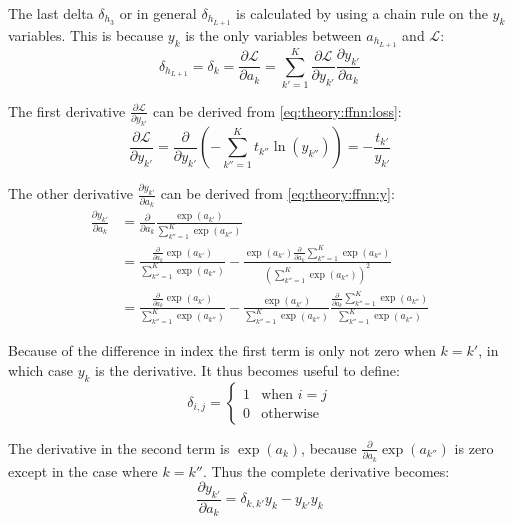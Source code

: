 The last delta $\delta_{h_3}$ or in general $\delta_{h_{L+1}}$ is calculated by using a chain rule on the $y_k$ variables. This is because $y_k$ is the only variables between $a_{h_{L+1}}$ and $\mathcal{L}$:
\begin{equation}
\delta_{h_{L + 1}} = \delta_k = \frac{\partial \mathcal{L}}{\partial a_k} = \sum_{k'=1}^K \frac{\partial \mathcal{L}}{\partial y_{k'}} \frac{\partial y_{k'}}{\partial a_k}
\label{eq:theory:ffnn:bprop-deltaK}
\end{equation}

The first derivative $\frac{\partial \mathcal{L}}{\partial y_{k'}}$ can be derived from \eqref{eq:theory:ffnn:loss}:
\begin{equation}
\frac{\partial \mathcal{L}}{\partial y_{k'}} = \frac{\partial}{\partial y_{k'}} \left(- \sum_{k''=1}^K t_{k''} \ln(y_{k''})\right) = -\frac{t_{k'}}{y_{k'}}
\label{eq:theory:ffnn:bprop-Ldy}
\end{equation}

The other derivative $\frac{\partial y_{k'}}{\partial a_k}$ can be derived from \eqref{eq:theory:ffnn:y}:
\begin{equation}
\begin{aligned}
\frac{\partial y_{k'}}{\partial a_k}
&= \frac{\partial}{\partial a_k} \frac{\exp(a_{k'})}{\sum_{k''=1}^K \exp(a_{k''})} \\
&= \frac{\frac{\partial}{\partial a_k} \exp(a_{k'})}{\sum_{k''=1}^K \exp(a_{k''})}
- \frac{\exp(a_{k'}) \frac{\partial}{\partial a_k} \sum_{k''=1}^K \exp(a_{k''})}{\left(\sum_{k''=1}^K \exp(a_{k''})\right)^2} \\
&= \frac{\frac{\partial}{\partial a_k} \exp(a_{k'})}{\sum_{k''=1}^K \exp(a_{k''})}
- \frac{\exp(a_{k'})}{\sum_{k''=1}^K \exp(a_{k''})} \frac{\frac{\partial}{\partial a_k} \sum_{k''=1}^K \exp(a_{k''})}{\sum_{k''=1}^K \exp(a_{k''})}
\end{aligned}
\end{equation}

Because of the difference in index the first term is only not zero when $k = k'$, in which case $y_k$ is the derivative. It thus becomes useful to define:
\begin{equation}
\delta_{i,j} = \begin{cases}1& \text{when } i = j \\ 0 & \text{otherwise}\end{cases}
\end{equation}

The derivative in the second term is $\exp(a_k)$, because $\frac{\partial}{\partial a_k} \exp(a_{k''})$ is zero except in the case where $k = k''$. Thus the complete derivative becomes:
\begin{equation}
\frac{\partial y_{k'}}{\partial a_k} = \delta_{k, k'} y_k - y_{k'} y_k
\label{eq:theory:ffnn:bprop-yda}
\end{equation}

